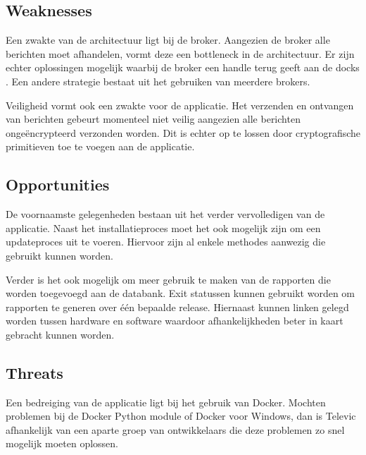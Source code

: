 \subsection{Weaknesses}
Een zwakte van de architectuur ligt bij de broker.
Aangezien de broker alle berichten moet afhandelen, vormt deze een bottleneck in de architectuur.
Er zijn echter oplossingen mogelijk waarbij de broker een handle terug geeft aan de docks \citep{adler1995distributed}. 
Een andere strategie bestaat uit het gebruiken van meerdere brokers.

Veiligheid vormt ook een zwakte voor de applicatie.
Het verzenden en ontvangen van berichten gebeurt momenteel niet veilig aangezien alle berichten ongeëncrypteerd verzonden worden.
Dit is echter op te lossen door cryptografische primitieven toe te voegen aan de applicatie.

\subsection{Opportunities}
De voornaamste gelegenheden bestaan uit het verder vervolledigen van de applicatie.
Naast het installatieproces moet het ook mogelijk zijn om een updateproces uit te voeren.
Hiervoor zijn al enkele methodes aanwezig die gebruikt kunnen worden.

Verder is het ook mogelijk om meer gebruik te maken van de rapporten die worden toegevoegd aan de databank.
Exit statussen kunnen gebruikt worden om rapporten te generen over één bepaalde release.
Hiernaast kunnen linken gelegd worden tussen hardware en software waardoor afhankelijkheden beter in kaart gebracht kunnen worden.

\subsection{Threats}
Een bedreiging van de applicatie ligt bij het gebruik van Docker.
Mochten problemen bij de Docker Python module of Docker voor Windows, dan is Televic afhankelijk van een aparte groep van ontwikkelaars die deze problemen zo snel mogelijk moeten oplossen.


